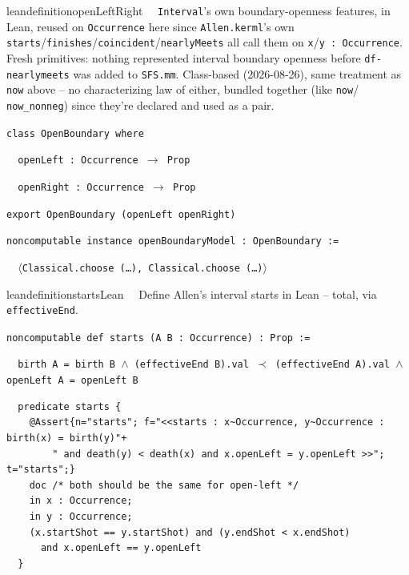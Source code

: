 \begin{restatable}{leandefinition}{openLeftRight}~~ \texttt{Interval}'s own
boundary-openness features, in Lean, reused on \texttt{Occurrence} here since \texttt{Allen.kerml}'s own
\texttt{starts}/\texttt{finishes}/\texttt{coincident}/\texttt{nearlyMeets} all call them on
\texttt{x}/\texttt{y~:~Occurrence}. Fresh primitives: nothing represented interval boundary openness before
\texttt{df-nearlymeets} was added to \texttt{SFS.mm}. Class-based (2026-08-26), same treatment as
\texttt{now} above -- no characterizing law of either, bundled together (like \texttt{now}/
\texttt{now\_nonneg}) since they're declared and used as a pair.

\texttt{\textcolor{leancolor}{class} \textcolor{leanyellow}{OpenBoundary} \textcolor{leancolor}{where}}

\texttt{~~openLeft : Occurrence $\to$ Prop}

\texttt{~~openRight : Occurrence $\to$ Prop}

\texttt{\textcolor{leancolor}{export} OpenBoundary (openLeft openRight)}

\texttt{\textcolor{leancolor}{noncomputable instance} \textcolor{leanyellow}{openBoundaryModel} : OpenBoundary :=}

\texttt{~~$\langle$Classical.choose (\ldots), Classical.choose (\ldots)$\rangle$}
\label{openLeft}
\end{restatable}

\begin{restatable}{leandefinition}{startsLean}~~ Define Allen's interval starts in Lean --
total, via \texttt{effectiveEnd}.

\texttt{\textcolor{leancolor}{noncomputable def} \textcolor{leanyellow}{starts} (A B : Occurrence) : Prop :=}

\texttt{~~birth A = birth B $\wedge$ (effectiveEnd B).val $\prec$ (effectiveEnd A).val $\wedge$ openLeft A = openLeft B}
\label{starts}
\end{restatable}

\begin{lstlisting}
  predicate starts {
    @Assert{n="starts"; f="<<starts : x~Occurrence, y~Occurrence : birth(x) = birth(y)"+
        " and death(y) < death(x) and x.openLeft = y.openLeft >>"; t="starts";}
    doc /* both should be the same for open-left */
    in x : Occurrence;
    in y : Occurrence;
    (x.startShot == y.startShot) and (y.endShot < x.endShot)
      and x.openLeft == y.openLeft
  }
\end{lstlisting}

